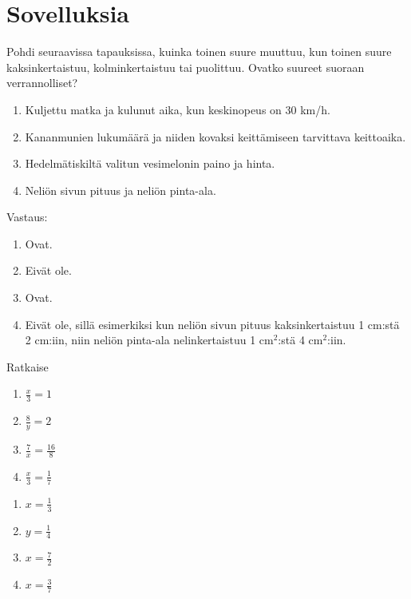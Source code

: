 \section{Sovelluksia}

\begin{tehtava}
    Pohdi seuraavissa tapauksissa, kuinka toinen suure muuttuu, kun toinen suure
    kaksinkertaistuu, kolminkertaistuu tai puolittuu. Ovatko suureet
    suoraan verrannolliset?
    
    \begin{enumerate}
        \item Kuljettu matka ja kulunut aika, kun keskinopeus on 30 km/h.
        \item Kananmunien lukumäärä ja niiden kovaksi keittämiseen tarvittava keittoaika.
        \item Hedelmätiskiltä valitun vesimelonin paino ja hinta.
        \item Neliön sivun pituus ja neliön pinta-ala.
    \end{enumerate}
    
    \begin{vastaus}
        Vastaus:
        \begin{enumerate}
            \item Ovat.
            \item Eivät ole.
            \item Ovat.
            \item Eivät ole, sillä esimerkiksi kun neliön sivun pituus
                kaksinkertaistuu 1 cm:stä 2 cm:iin, niin neliön pinta-ala
                nelinkertaistuu 1 cm$^2$:stä 4 cm$^2$:iin.
        \end{enumerate}
    \end{vastaus}
\end{tehtava}

\begin{tehtava}
Ratkaise
\begin{enumerate}
\item $ \frac{x}{3} = 1$
\item $ \frac{8}{y} = 2$
\item $ \frac{7}{x} = \frac{16}{8}$
\item $ \frac{x}{3} = \frac{1}{7}$
\end{enumerate}
\begin{vastaus}
\begin{enumerate}
\item $x= \frac{1}{3}$
\item $y= \frac{1}{4}$
\item $x= \frac{7}{2}$
\item $x= \frac{3}{7}$
\end{enumerate}
\end{vastaus}
\end{tehtava}


